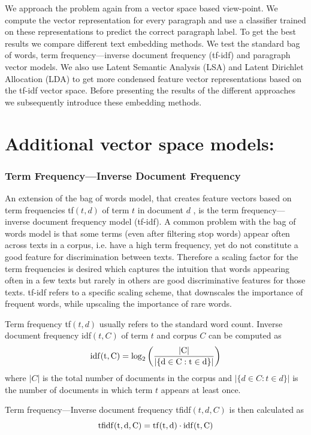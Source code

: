 We approach the problem again from a vector space based view-point. We compute the vector representation for every paragraph and use a classifier trained on these representations to predict the correct paragraph label. To get the best results we compare different text embedding methods. We test the standard bag of words, term frequency---inverse document frequency (tf-idf) and paragraph vector models. We also use Latent Semantic Analysis (LSA) and Latent Dirichlet Allocation (LDA) to get more condensed feature vector representations based on the tf-idf vector space. Before presenting the results of the different approaches we subsequently introduce these embedding methods.

\section*{Additional vector space models:}

\subsubsection*{Term Frequency---Inverse Document Frequency}

An extension of the bag of words model, that creates feature vectors based on term frequencies tf$(t,d)$ of term $t$ in document $d$ , is the term frequency---inverse document frequency model (tf-idf).
A common problem with the bag of words model is that some terms (even
after filtering stop words) appear often across texts in a corpus,
i.e. have a high term frequency, yet do not constitute a good feature
for discrimination between texts. Therefore a scaling factor for the
term frequencies is desired which captures the intuition that words
appearing often in a few texts but rarely in others are good discriminative
features for those texts. tf-idf refers to a specific scaling scheme, that downscales the
importance of frequent words, while upscaling the importance of rare
words. 

Term frequency tf$(t,d)$ usually refers to the standard word count.
Inverse document frequency idf$(t,C)$ of term $t$ and corpus $C$
can be computed as 
\[
\rm{idf}(t,C)=\log_{2}\left(\frac{|C|}{|\{d\in C:t\in d\}|}\right)
\]
where $|C|$ is the total number of documents in the corpus and $|\{d\in C:t\in d\}|$
is the number of documents in which term $t$ appears at least once.

Term frequency---Inverse document frequency tfidf$(t,d,C)$ is then
calculated as 
\[
\rm{tfidf}(t,d,C)=\rm{tf}(t,d)\cdot \rm{idf}(t,C)
\]


